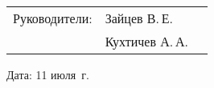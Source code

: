 \documentclass[dvipsnames,pdf, unicode, 12pt, a4paper, oneside, fleqn]{article}
\begin{document}
\vfill

\noindent\begin{tabular}{@{}l l l}
Руководители: & Зайцев В.\,Е. & \underline{\hspace{2in}}\\
 \rule{0pt}{10pt} & Кухтичев А.\,А. & \underline{\hspace{2in}}
\end{tabular}
\vspace{12pt}

\noindent
Дата: 11 июля \the\year\,г.
\pagebreak
\end{document}
